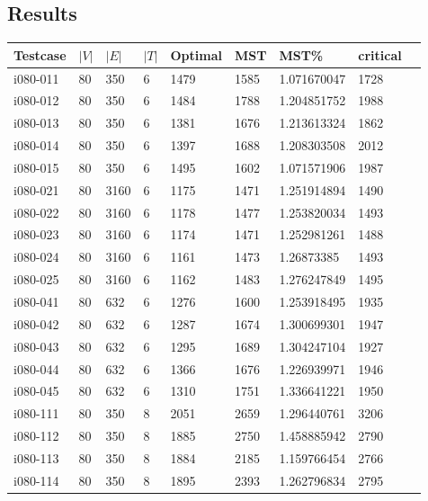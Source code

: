 
\begin{appendices}
\chapter{Results}\label{chapter:appendix}

\begin{longtable}[htbp]{l l l l l l l l l}
Testcase	&	$|V|$	&	$|E|$	&	$|T|$	&	Optimal	&	MST	&	MST\%	&	critical \\ \hline
\endhead
 i080-011	&	80 	&	350 	&	6 	&	1479	&	1585	&	1.071670047	&	1728	\\
 i080-012	&	80 	&	350 	&	6 	&	1484	&	1788	&	1.204851752	&	1988	\\
 i080-013	&	80 	&	350 	&	6 	&	1381	&	1676	&	1.213613324	&	1862	\\
 i080-014	&	80 	&	350 	&	6 	&	1397	&	1688	&	1.208303508	&	2012	\\
 i080-015	&	80 	&	350 	&	6 	&	1495	&	1602	&	1.071571906	&	1987	\\
\hline
 i080-021	&	80 	&	3160 	&	6 	&	1175	&	1471	&	1.251914894	&	1490	\\
 i080-022	&	80 	&	3160 	&	6 	&	1178	&	1477	&	1.253820034	&	1493	\\
 i080-023	&	80 	&	3160 	&	6 	&	1174	&	1471	&	1.252981261	&	1488	\\
 i080-024	&	80 	&	3160 	&	6 	&	1161	&	1473	&	1.26873385	&	1493	\\
 i080-025	&	80 	&	3160 	&	6 	&	1162	&	1483	&	1.276247849	&	1495	\\
\hline
 i080-041	&	80 	&	632 	&	6 	&	1276	&	1600	&	1.253918495	&	1935	\\
 i080-042	&	80 	&	632 	&	6 	&	1287	&	1674	&	1.300699301	&	1947	\\
 i080-043	&	80 	&	632 	&	6 	&	1295	&	1689	&	1.304247104	&	1927	\\
 i080-044	&	80 	&	632 	&	6 	&	1366	&	1676	&	1.226939971	&	1946	\\
 i080-045	&	80 	&	632 	&	6 	&	1310	&	1751	&	1.336641221	&	1950	\\
\hline
 i080-111	&	80 	&	350 	&	8 	&	2051	&	2659	&	1.296440761	&	3206	\\
 i080-112	&	80 	&	350 	&	8 	&	1885	&	2750	&	1.458885942	&	2790	\\
 i080-113	&	80 	&	350 	&	8 	&	1884	&	2185	&	1.159766454	&	2766	\\
 i080-114	&	80 	&	350 	&	8 	&	1895	&	2393	&	1.262796834	&	2795	\\

\end{longtable}
\end{appendices}
